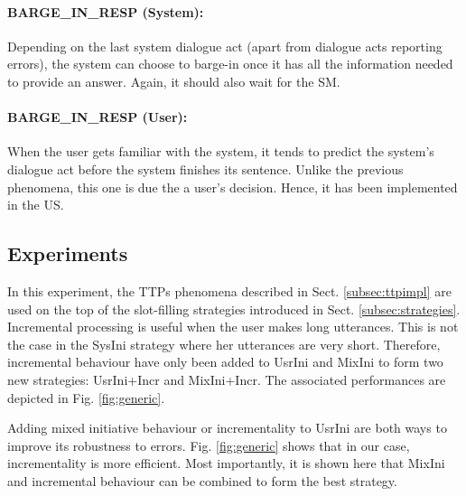         \paragraph{BARGE\_IN\_RESP (System):} Depending on the last system dialogue act (apart from dialogue acts reporting errors), the system can choose to barge-in once it has all the information needed to provide an answer. Again, it should also wait for the SM.
         
         \paragraph{BARGE\_IN\_RESP (User):} When the user gets familiar with the system, it tends to predict the system's dialogue act before the system finishes its sentence. Unlike the previous phenomena, this one is due the a user's decision. Hence, it has been implemented in the US.
    
    \subsection{Experiments}
    
    	In this experiment, the TTPs phenomena described in Sect. \ref{subsec:ttpimpl} are used on the top of the slot-filling strategies introduced in Sect. \ref{subsec:strategies}. Incremental processing is useful when the user makes long utterances. This is not the case in the SysIni strategy where her utterances are very short. Therefore, incremental behaviour have only been added to UsrIni and MixIni to form two new strategies: UsrIni+Incr and MixIni+Incr. The associated performances are depicted in Fig. \ref{fig:generic}.
        
     	Adding mixed initiative behaviour or incrementality to UsrIni are both ways to improve its robustness to errors. Fig. \ref{fig:generic} shows that in our case, incrementality is more efficient. Most importantly, it is shown here that MixIni and incremental behaviour can be combined to form the best strategy.
    
